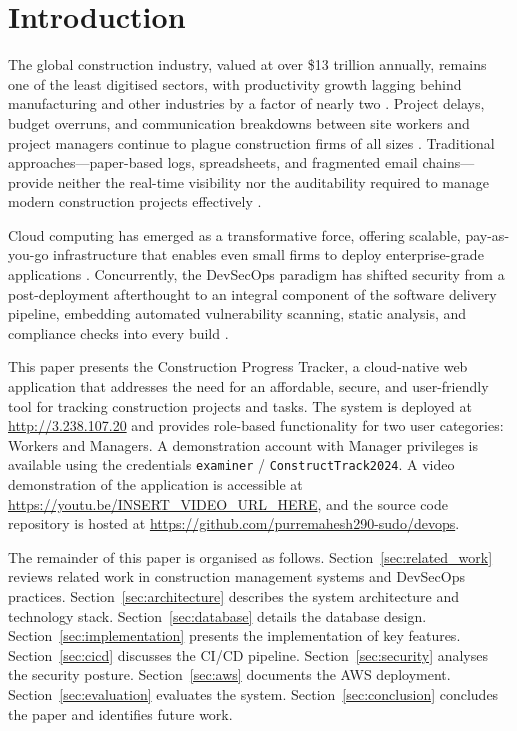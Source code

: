 \documentclass[conference]{IEEEtran}
\begin{document}
\section{Introduction}
\label{sec:introduction}

The global construction industry, valued at over \$13 trillion annually, remains one of the least digitised sectors, with productivity growth lagging behind manufacturing and other industries by a factor of nearly two \cite{mckinsey2017}. Project delays, budget overruns, and communication breakdowns between site workers and project managers continue to plague construction firms of all sizes \cite{aziz2013}. Traditional approaches---paper-based logs, spreadsheets, and fragmented email chains---provide neither the real-time visibility nor the auditability required to manage modern construction projects effectively \cite{bilal2016}.

Cloud computing has emerged as a transformative force, offering scalable, pay-as-you-go infrastructure that enables even small firms to deploy enterprise-grade applications \cite{mell2011nist}. Concurrently, the DevSecOps paradigm has shifted security from a post-deployment afterthought to an integral component of the software delivery pipeline, embedding automated vulnerability scanning, static analysis, and compliance checks into every build \cite{myrbakken2017devsecops}.

This paper presents the Construction Progress Tracker, a cloud-native web application that addresses the need for an affordable, secure, and user-friendly tool for tracking construction projects and tasks. The system is deployed at \url{http://3.238.107.20} and provides role-based functionality for two user categories: Workers and Managers. A demonstration account with Manager privileges is available using the credentials \texttt{examiner} / \texttt{ConstructTrack2024}. A video demonstration of the application is accessible at \url{https://youtu.be/INSERT\_VIDEO\_URL\_HERE}, and the source code repository is hosted at \url{https://github.com/purremahesh290-sudo/devops}.

The remainder of this paper is organised as follows. Section~\ref{sec:related_work} reviews related work in construction management systems and DevSecOps practices. Section~\ref{sec:architecture} describes the system architecture and technology stack. Section~\ref{sec:database} details the database design. Section~\ref{sec:implementation} presents the implementation of key features. Section~\ref{sec:cicd} discusses the CI/CD pipeline. Section~\ref{sec:security} analyses the security posture. Section~\ref{sec:aws} documents the AWS deployment. Section~\ref{sec:evaluation} evaluates the system. Section~\ref{sec:conclusion} concludes the paper and identifies future work.
\end{document}
